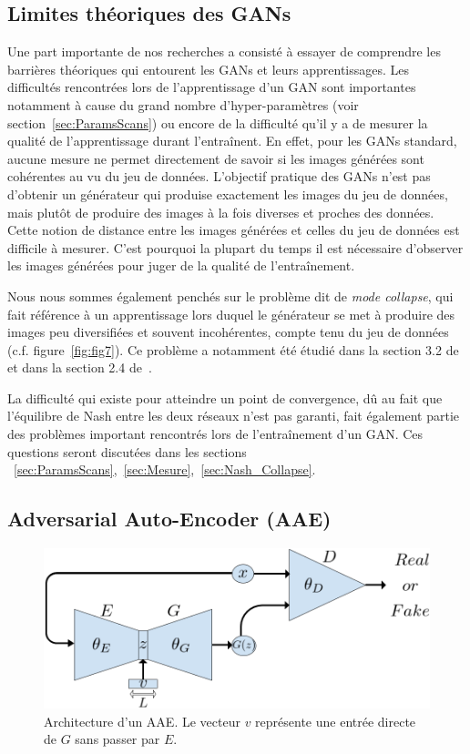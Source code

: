 \documentclass[11pt,francais]{article}
\begin{document}
\subsection{Limites théoriques des GANs}
\label{sec:CompEtLimites}
Une part importante de nos recherches a consisté à essayer de comprendre les barrières théoriques qui entourent les GANs et leurs apprentissages. Les difficultés rencontrées lors de l'apprentissage d'un GAN sont importantes notamment à cause du grand nombre d'hyper-paramètres (voir section~\ref{sec:ParamsScans}) ou encore de la difficulté qu'il y a de mesurer la qualité de l'apprentissage durant l'entraînent. 
En effet, pour les GANs standard, aucune mesure ne permet directement de savoir si les images générées sont cohérentes au vu du jeu de données. L'objectif pratique des GANs n'est pas d'obtenir un générateur qui produise exactement les images du jeu de données, mais plutôt de produire des images à la fois diverses et proches des données. Cette notion de distance entre les images générées et celles du jeu de données est difficile à mesurer. C'est pourquoi la plupart du temps il est nécessaire d'observer les images générées pour juger de la qualité de l'entraînement.

Nous nous sommes également penchés sur le problème dit de \textit{mode collapse}, qui fait référence à un apprentissage lors duquel le générateur se met à produire des images peu diversifiées et souvent incohérentes, compte tenu du jeu de données (c.f. figure~\ref{fig:fig7}). Ce problème a notamment été  étudié dans la section 3.2 de~\cite{salimans2016improved} et dans la section 2.4 de~\cite{DBLP:journals/corr/MetzPPS16}.

La difficulté qui existe pour atteindre un point de convergence, dû au fait que l'équilibre de Nash entre les deux réseaux n'est pas garanti, fait également partie des problèmes important rencontrés lors de l'entraînement d'un GAN.
Ces questions seront discutées dans les sections ~\ref{sec:ParamsScans},~\ref{sec:Mesure},~\ref{sec:Nash_Collapse}.

\newpage
\subsection{Adversarial Auto-Encoder (AAE)}
\label{sec:AAE}

\begin{figure}[h!]
    \centering
    \includegraphics[width=\textwidth]{Figures/GAN/AAE_representation.png}
    \caption{Architecture d'un AAE. Le vecteur \(v\) représente une entrée directe de \(G\) sans passer par \(E\).}
    \label{fig:fig10}
\end{figure}
\end{document}
